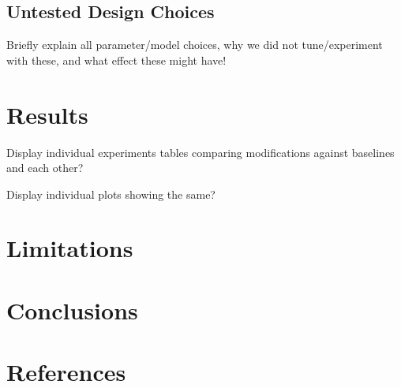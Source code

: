 \documentclass{article}
\begin{document}
\subsection{Untested Design Choices}

Briefly explain all parameter/model choices, why we did not tune/experiment with these, and what effect these might have!

\section{Results}

Display individual experiments tables comparing modifications against baselines and each other?

Display individual plots showing the same?

\section{Limitations}

\section{Conclusions}

\section*{References}
\end{document}
